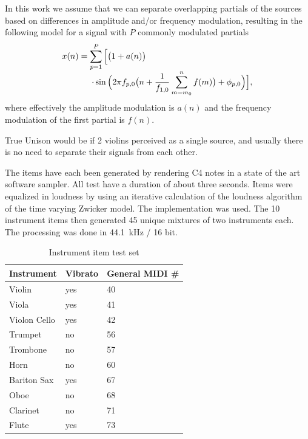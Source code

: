 In this work we assume that we can separate overlapping partials of the sources based on differences in amplitude and/or frequency modulation, resulting in the following model for a signal with $P$ commonly modulated partials
\begin{equation}
  \begin{array}{l}
   x(n) = \displaystyle \sum_{p=1}^{P} \Big[\big(1 + a(n)\big) \\
   \hspace{3.5em}\displaystyle \cdot\sin \Big(2\pi f_{p,0}\big(n + \frac{1}{f_{1,0}} \sum_{m=m_0}^{n}{f(m)} \big) + \phi_{p,0} \Big)\Big] ,
  \end{array}
\end{equation}
where effectively the amplitude modulation is $a(n)$ and the frequency modulation of the first partial is $f(n)$.

True Unison would be if 2 violins perceived as a single source, and usually there is no need to separate their signals from each other.

The items have each been generated by rendering C4 notes in a state of the art software sampler. All test have a duration of about three seconds. Items were equalized in loudness by using an iterative calculation of the loudness algorithm of the time varying Zwicker model. The implementation \cite{genesis12} was used. The 10 instrument items then generated 45 unique mixtures of two instruments each. The processing was done in 44.1~kHz / 16 bit.

\begin{table}
\begin{center}
\footnotesize
\begin{tabular}{ l l l}
  Instrument & Vibrato &  General MIDI \# \\
  \hline
  Violin & yes & 40 \\
  Viola & yes & 41 \\
  Violon Cello & yes & 42 \\
  Trumpet & no & 56 \\
  Trombone & no & 57\\
  Horn & no & 60  \\
  Bariton Sax & yes & 67 \\ %
  Oboe & no & 68\\
  Clarinet & no & 71\\
  Flute & yes & 73\\
\end{tabular}
\end{center}
\caption{Instrument item test set}
\label{tab:testset}
\end{table}

